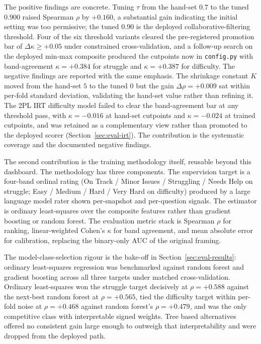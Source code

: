 The positive findings are concrete.
Tuning $\tau$ from the hand-set $0.7$ to the tuned $0.900$ raised Spearman $\rho$ by $+0.160$, a substantial gain indicating the initial setting was too permissive; the tuned $0.90$ is the deployed collaborative-filtering threshold.
Four of the six threshold variants cleared the pre-registered promotion bar of $\Delta\kappa \geq +0.05$ under constrained cross-validation, and a follow-up search on the deployed min-max composite produced the cutpoints now in \texttt{config.py} with band-agreement $\kappa = +0.384$ for struggle and $\kappa = +0.387$ for difficulty.
The negative findings are reported with the same emphasis.
The shrinkage constant $K$ moved from the hand-set $5$ to the tuned $0$ but the gain $\Delta\rho = +0.009$ sat within per-fold standard deviation, validating the hand-set value rather than refining it.
The 2PL IRT difficulty model failed to clear the band-agreement bar at any threshold pass, with $\kappa = -0.016$ at hand-set cutpoints and $\kappa = -0.024$ at trained cutpoints, and was retained as a complementary view rather than promoted to the deployed scorer (Section~\ref{sec:eval-irt}).
The contribution is the systematic coverage and the documented negative findings.

The second contribution is the training methodology itself, reusable beyond this dashboard.
The methodology has three components.
The supervision target is a four-band ordinal rating (On Track / Minor Issues / Struggling / Needs Help on struggle; Easy / Medium / Hard / Very Hard on difficulty) produced by a large language model rater shown per-snapshot and per-question signals.
The estimator is ordinary least-squares over the composite features rather than gradient boosting or random forest.
The evaluation metric stack is Spearman $\rho$ for ranking, linear-weighted Cohen's $\kappa$ for band agreement, and mean absolute error for calibration, replacing the binary-only AUC of the original framing.

The model-class-selection rigour is the bake-off in Section~\ref{sec:eval-results}: ordinary least-squares regression was benchmarked against random forest and gradient boosting across all three targets under matched cross-validation.
Ordinary least-squares won the struggle target decisively at $\rho = +0.588$ against the next-best random forest at $\rho = +0.565$, tied the difficulty target within per-fold noise at $\rho = +0.468$ against random forest's $\rho = +0.479$, and was the only competitive class with interpretable signed weights.
Tree based alternatives offered no consistent gain large enough to outweigh that interpretability and were dropped from the deployed path.

